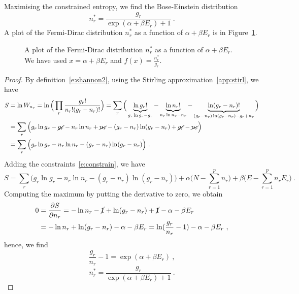     Maximising the constrained entropy, we find the Bose-Einstein distribution 
    \begin{equation*}
        n_r^* = \frac{g_r}{\exp(\alpha + \beta E_r) + 1} ~.
    \end{equation*}
    A plot of the Fermi-Dirac distribution $n_r^*$ as a function of $\alpha + \beta E_r$ is in Figure~\ref{en:fd}.
    \begin{figure}
        \centering
        \caption{A plot of the Fermi-Dirac distribution $n_r^*$ as a function of $\alpha + \beta E_r$. We have used $x = \alpha + \beta E_r $ and $f(x) = \frac{n_r^*}{g_r}$.}
        \label{en:fd}
    \end{figure}
    \begin{proof}
        By definition~\eqref{e:shannon2}, using the Stirling approximation~\eqref{app:stirl}, we have
        \begin{equation*}
        \begin{aligned}
            S & = \ln W_{n_r} = \ln \Big (\prod_r \frac{g_r!}{n_r! (g_r - n_r)!} \Big) = \sum_r \Big ( \underbrace{\ln g_r!}_{g_r \ln g_r - g_r} - \underbrace{\ln n_r!}_{n_r \ln n_r - n_r} - \underbrace{\ln (g_r - n_r)!}_{(g_r - n_r) \ln (g_r - n_r) - g_r + n_r} \Big) \\ & = \sum_r \Big ( g_r \ln g_r - \cancel{g_r} - n_r \ln n_r + \cancel{n_r} - (g_r - n_r) \ln (g_r - n_r) + \cancel{g_r} - \cancel{n_r} \Big) \\ & = \sum_r \Big ( g_r \ln g_r - n_r \ln n_r - (g_r - n_r) \ln (g_r - n_r) \Big) 
             ~.
        \end{aligned}
        \end{equation*}
        Adding the constraints~\eqref{e:constrain}, we have
        \begin{equation*}
            S =  \sum_r \Big ( g_r \ln g_r - n_r \ln n_r - (g_r - n_r) \ln (g_r - n_r) \Big) + \alpha \Big (N - \sum_{r=1}^p n_r \Big) + \beta \Big (E - \sum_{r=1}^p n_r E_r \Big ) ~.
        \end{equation*}
        Computing the maximum by putting the derivative to zero, we obtain
        \begin{equation*}
        \begin{aligned}
            0 & = \frac{\partial S}{\partial n_r} = - \ln n_r - \cancel{1} + \ln (g_r - n_r) + \cancel{1} - \alpha - \beta E_r \\ & = - \ln n_r + \ln (g_r - n_r) - \alpha - \beta E_r = \ln (\frac{g_r}{n_r} - 1) - \alpha - \beta E_r~ ,
        \end{aligned}
        \end{equation*}
        hence, we find
        \begin{equation*}
            \frac{g_r}{n_r} - 1 = \exp(\alpha + \beta E_r) ~,
        \end{equation*}
        \begin{equation*}
            n_r^* = \frac{g_r}{\exp(\alpha + \beta E_r) + 1} ~.
        \end{equation*}
    \end{proof}
    

